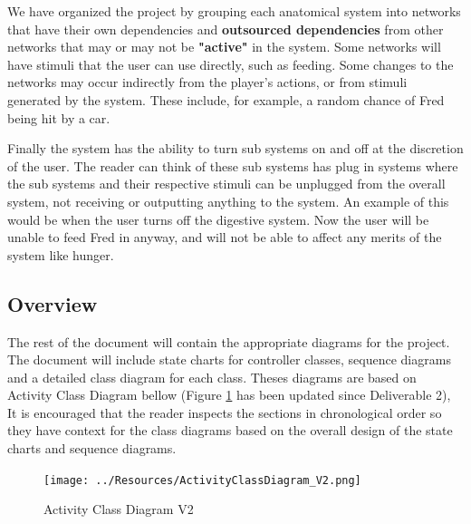 \documentclass[]{article}
\begin{document}
We have organized the project by grouping each anatomical system into networks that have their own dependencies and \textbf{outsourced dependencies} from other networks that may or may not be \textbf{"active"} in the system. Some networks will have stimuli that
the user can use directly, such as feeding. Some changes to the networks may occur indirectly from the player's actions, or from stimuli generated by the system. These include, for example, a random chance of Fred being hit by a car.

Finally the system has the ability to turn sub systems on and off at the discretion of the user. The reader can think of these sub systems has plug in systems where the sub systems and their respective stimuli can be unplugged from the overall system, not receiving or outputting anything to the system. An example of this would be when the user turns off the digestive system. Now the user will be unable to feed Fred in anyway, and will not be able to affect any merits of the system like hunger.

\subsection*{Overview}
\label{sub:overview}
The rest of the document will contain the appropriate diagrams for the project. The document will include state charts for controller classes, sequence diagrams and a detailed class diagram for each class. Theses diagrams are based on Activity Class Diagram bellow (Figure \ref{ActivityClassDiagram} has been updated since Deliverable 2), It is encouraged that the reader inspects the sections in chronological order so they have context for the class diagrams based on the overall design of the state charts and sequence diagrams.\\

\begin{figure}[H]
	\centering
	\texttt{[image: ../Resources/ActivityClassDiagram\_V2.png]}
	\caption{Activity Class Diagram V2}
	\label{ActivityClassDiagram}
\end{figure}




\end{document}
